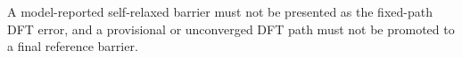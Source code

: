 A model-reported self-relaxed barrier must not be presented as the fixed-path DFT error, and a provisional or unconverged DFT path must not be promoted to a final reference barrier.
